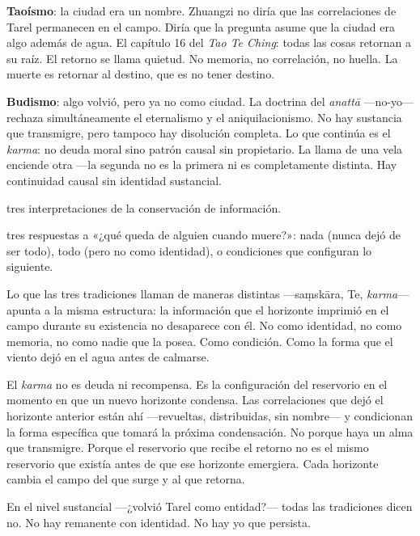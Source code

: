 \textbf{Taoísmo}: la ciudad era un nombre. Zhuangzi no diría que las correlaciones de Tarel permanecen en el campo. Diría que la pregunta asume que la ciudad era algo además de agua. El capítulo 16 del \emph{Tao Te Ching}: todas las cosas retornan a su raíz. El retorno se llama quietud. No memoria, no correlación, no huella. La muerte es retornar al destino, que es no tener destino.

\textbf{Budismo}: algo volvió, pero ya no como ciudad. La doctrina del \emph{anattā} —no-yo— rechaza simultáneamente el eternalismo y el aniquilacionismo. No hay sustancia que transmigre, pero tampoco hay disolución completa. Lo que continúa es el \emph{karma}: no deuda moral sino patrón causal sin propietario. La llama de una vela enciende otra —la segunda no es la primera ni es completamente distinta. Hay continuidad causal sin identidad sustancial.

\begin{fisica}
 tres interpretaciones de la conservación de información.

 tres respuestas a «¿qué queda de alguien cuando muere?»: nada (nunca dejó de ser todo), todo (pero no como identidad), o condiciones que configuran lo siguiente.
\end{fisica}
\noindent Lo que las tres tradiciones llaman de maneras distintas —saṃskāra, Te, \emph{karma}— apunta a la misma estructura: la información que el horizonte imprimió en el campo durante su existencia no desaparece con él. No como identidad, no como memoria, no como nadie que la posea. Como condición. Como la forma que el viento dejó en el agua antes de calmarse.

El \emph{karma} no es deuda ni recompensa. Es la configuración del reservorio en el momento en que un nuevo horizonte condensa. Las correlaciones que dejó el horizonte anterior están ahí —revueltas, distribuidas, sin nombre— y condicionan la forma específica que tomará la próxima condensación. No porque haya un alma que transmigre. Porque el reservorio que recibe el retorno no es el mismo reservorio que existía antes de que ese horizonte emergiera. Cada horizonte cambia el campo del que surge y al que retorna.

\noindent En el nivel sustancial —¿volvió Tarel como entidad?— todas las tradiciones dicen no. No hay remanente con identidad. No hay yo que persista.

